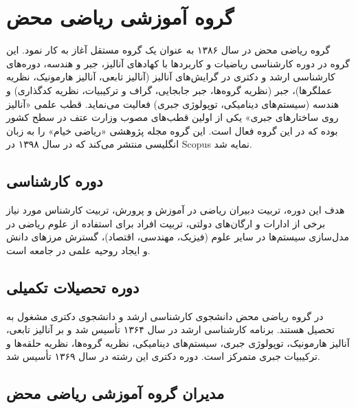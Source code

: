 \documentclass[
  letterpaper,
  DIV=11,
  numbers=noendperiod]{scrreprt}
\begin{document}
\section{گروه آموزشی ریاضی
محض}\label{ux6afux631ux648ux647-ux622ux645ux648ux632ux634ux6cc-ux631ux6ccux627ux636ux6cc-ux645ux62dux636}

گروه ریاضی محض در سال ۱۳۸۶ به عنوان یک گروه مستقل آغاز به کار نمود. این
گروه در دوره کارشناسی ریاضیات و کاربردها با کهادهای آنالیز، جبر و هندسه،
دوره‌های کارشناسی ارشد و دکتری در گرایش‌های آنالیز (آنالیز تابعی، آنالیز
هارمونیک، نظریه عملگرها)، جبر (نظریه گروه‌ها، جبر جابجایی، گراف و
ترکیبیات، نظریه کدگذاری) و هندسه (سیستم‌های دینامیکی، توپولوژی جبری)
فعالیت می‌نماید. قطب علمی «آنالیز روی ساختارهای جبری» یکی از اولین قطب‌های
مصوب وزارت عتف در سطح کشور بوده که در این گروه فعال است. این گروه مجله
پژوهشی «ریاضی خیام» را به زبان انگلیسی منتشر می‌کند که در سال ۱۳۹۸ در
Scopus نمایه شد.

\subsection{دوره
کارشناسی}\label{ux62fux648ux631ux647-ux6a9ux627ux631ux634ux646ux627ux633ux6cc-1}

هدف این دوره، تربیت دبیران ریاضی در آموزش و پرورش، تربیت کارشناس مورد
نیاز برخی از ادارات و ارگان‌های دولتی، تربیت افراد برای استفاده از علوم
ریاضی در مدل‌سازی سیستم‌ها در سایر علوم (فیزیک، مهندسی، اقتصاد)، گسترش
مرزهای دانش و ایجاد روحیه علمی در جامعه است.

\subsection{دوره تحصیلات
تکمیلی}\label{ux62fux648ux631ux647-ux62aux62dux635ux6ccux644ux627ux62a-ux62aux6a9ux645ux6ccux644ux6cc-1}

در گروه ریاضی محض دانشجوی کارشناسی ارشد و دانشجوی دکتری مشغول به تحصیل
هستند. برنامه کارشناسی ارشد در سال ۱۳۶۴ تأسیس شد و بر آنالیز تابعی،
آنالیز هارمونیک، توپولوژی جبری، سیستم‌های دینامیکی، نظریه گروه‌ها، نظریه
حلقه‌ها و ترکیبیات جبری متمرکز است. دوره دکتری این رشته در سال ۱۳۶۹ تأسیس
شد.

\subsection{مدیران گروه آموزشی ریاضی
محض}\label{ux645ux62fux6ccux631ux627ux646-ux6afux631ux648ux647-ux622ux645ux648ux632ux634ux6cc-ux631ux6ccux627ux636ux6cc-ux645ux62dux636}
\end{document}
